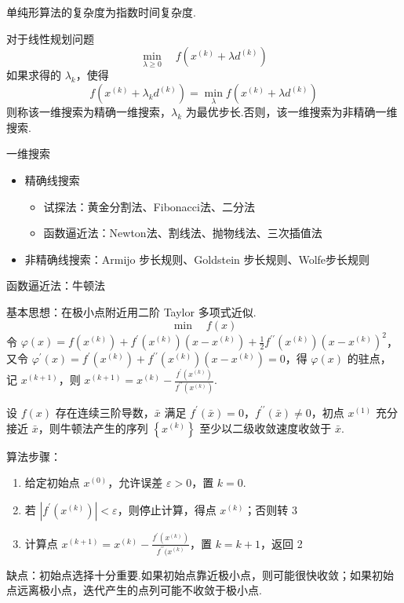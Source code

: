 \begin{note}
    单纯形算法的复杂度为指数时间复杂度.
\end{note}

\begin{note}
    对于线性规划问题 \[\min_{\lambda \ge 0} \quad f(x^{(k)} + \lambda d^{(k)})\] 如果求得的 $\lambda_k$，使得 \[f(x^{(k)} + \lambda_kd^{(k)}) = \min_\lambda f(x^{(k)} + \lambda d^{(k)})\]则称该一维搜索为精确一维搜索，$\lambda_k$ 为最优步长.否则，该一维搜索为非精确一维搜索.
\end{note}

\begin{note}
    一维搜索\begin{itemize}
        \item 精确线搜索\begin{itemize}
            \item 试探法：黄金分割法、Fibonacci法、二分法
            \item 函数逼近法：Newton法、割线法、抛物线法、三次插值法
        \end{itemize}
        \item 非精确线搜索：Armijo 步长规则、Goldstein 步长规则、Wolfe步长规则
    \end{itemize}
\end{note}

\begin{note}
    函数逼近法：牛顿法

    基本思想：在极小点附近用二阶 Taylor 多项式近似. \[\min \quad f(x)\]
    令 $\varphi(x)=f\left(x^{(k)}\right)+f^{\prime}\left(x^{(k)}\right)\left(x-x^{(k)}\right)+\frac{1}{2} f^{\prime \prime}\left(x^{(k)}\right)\left(x-x^{(k)}\right)^{2}$，又令 $\varphi^{\prime}(x)=f^{\prime}\left(x^{(k)}\right)+f^{\prime \prime}\left(x^{(k)}\right)\left(x-x^{(k)}\right)=0$，得 $\varphi(x)$ 的驻点，记 $x^{(k + 1)}$，则 $x^{(k+1)}=x^{(k)}-\frac{f^{\prime}\left(x^{(k)}\right)}{f^{\prime \prime}\left(x^{(k)}\right)}$.

    \begin{theorem}
        设 $f(x)$ 存在连续三阶导数，$\bar{x}$ 满足 $f^\prime(\bar{x}) = 0$，$f^{\prime\prime}(\bar{x}) \neq 0$，初点 $x^{(1)}$ 充分接近 $\bar{x}$，则牛顿法产生的序列 $\left\{x^{(k)}\right\}$ 至少以二级收敛速度收敛于 $\bar{x}$.
    \end{theorem}

    算法步骤：\begin{enumerate}
        \item 给定初始点 $x^{(0)}$，允许误差 $\varepsilon > 0$，置 $k = 0$.
        \item 若 $|f^\prime(x^{(k)})| < \varepsilon$，则停止计算，得点 $x^{(k)}$；否则转 3
        \item 计算点 $x^{(k + 1)} = x^{(k)} - \frac{f^\prime(x^{(k)})}{f^{\prime\prime}(x^{(k)}}$，置 $k = k + 1$，返回 2
    \end{enumerate}

    缺点：初始点选择十分重要.如果初始点靠近极小点，则可能很快收敛；如果初始点远离极小点，迭代产生的点列可能不收敛于极小点.
\end{note}

